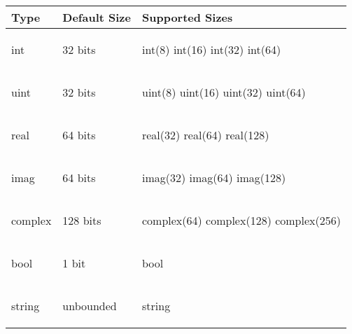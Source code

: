 \begin{center}
\begin{tabular}{|l|l|l|}
\hline
{\bf Type} & {\bf Default Size} & {\bf Supported Sizes}  \\
\hline
\begin{chapel}
int
\end{chapel}
& 32 bits & 
\begin{chapel}
int(8)
int(16) 
int(32) 
int(64) 
\end{chapel} \\
\hline
\begin{chapel}
uint
\end{chapel}
& 32 bits & 
\begin{chapel}
uint(8)
uint(16) 
uint(32) 
uint(64) 
\end{chapel} \\
\hline
\begin{chapel}
real
\end{chapel}
& 64 bits & 
\begin{chapel}
real(32)
real(64)
real(128)
\end{chapel} \\
\hline
\begin{chapel}
imag
\end{chapel} 
& 64 bits & 
\begin{chapel}
imag(32) 
imag(64)
imag(128)
\end{chapel} \\
\hline
\begin{chapel}
complex
\end{chapel}
& 128 bits & 
\begin{chapel}
complex(64)
complex(128)
complex(256)
\end{chapel} \\
\hline
\begin{chapel}
bool
\end{chapel} 
& 1 bit & 
\begin{chapel}
bool
\end{chapel}  \\
\hline
\begin{chapel}
string
\end{chapel}
& unbounded & 
\begin{chapel}
string 
\end{chapel} \\
\hline
\end{tabular}
\end{center}


